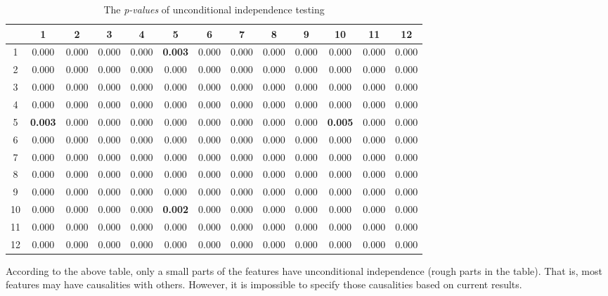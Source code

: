 \documentclass[12pt,a4paper]{article}
\theoremstyle{definition}
\begin{document}
\begin{table}[H]
	\renewcommand\arraystretch{1.35}
	\caption{The \textit{p-values} of unconditional independence testing}
	\label{tab:uncon-in}
	\centering
	
	\begin{tabular}{c|c|c|c|c|c|c|c|c|c|c|c|c}
		\centering
		\diagbox{id}{$p$}{id} & 1 & 2 & 3 & 4 & 5 & 6 & 7 & 8 & 9 & 10 & 11 & 12 \\
		\hline
		1 & 0.000 & 0.000 & 0.000 & 0.000 & \textbf{0.003} & 0.000 & 0.000 & 0.000 & 0.000 & 0.000 & 0.000 & 0.000 \\
		\hline
		2 & 0.000 & 0.000 & 0.000 & 0.000 & 0.000 & 0.000 & 0.000 & 0.000 & 0.000 & 0.000 & 0.000 & 0.000 \\
		\hline
		3 & 0.000 & 0.000 & 0.000 & 0.000 & 0.000 & 0.000 & 0.000 & 0.000 & 0.000 & 0.000 & 0.000 & 0.000 \\
		\hline
		4 & 0.000 & 0.000 & 0.000 & 0.000 & 0.000 & 0.000 & 0.000 & 0.000 & 0.000 & 0.000 & 0.000 & 0.000 \\
		\hline
		5 & \textbf{0.003} & 0.000 & 0.000 & 0.000 & 0.000 & 0.000 & 0.000 & 0.000 & 0.000 & \textbf{0.005} & 0.000 & 0.000 \\
		\hline
		6 & 0.000 & 0.000 & 0.000 & 0.000 & 0.000 & 0.000 & 0.000 & 0.000 & 0.000 & 0.000 & 0.000 & 0.000 \\
		\hline
		7 & 0.000 & 0.000 & 0.000 & 0.000 & 0.000 & 0.000 & 0.000 & 0.000 & 0.000 & 0.000 & 0.000 & 0.000 \\
		\hline
		8 & 0.000 & 0.000 & 0.000 & 0.000 & 0.000 & 0.000 & 0.000 & 0.000 & 0.000 & 0.000 & 0.000 & 0.000 \\
		\hline
		9 & 0.000 & 0.000 & 0.000 & 0.000 & 0.000 & 0.000 & 0.000 & 0.000 & 0.000 & 0.000 & 0.000 & 0.000 \\
		\hline
		10 & 0.000 & 0.000 & 0.000 & 0.000 & \textbf{0.002} & 0.000 & 0.000 & 0.000 & 0.000 & 0.000 & 0.000 & 0.000 \\
		\hline
		11 & 0.000 & 0.000 & 0.000 & 0.000 & 0.000 & 0.000 & 0.000 & 0.000 & 0.000 & 0.000 & 0.000 & 0.000 \\
		\hline
		12 & 0.000 & 0.000 & 0.000 & 0.000 & 0.000 & 0.000 & 0.000 & 0.000 & 0.000 & 0.000 & 0.000 & 0.000 \\
	\end{tabular}
\end{table}

According to the above table, only a small parts of the features have unconditional independence (rough parts in the table). That is, most features may have causalities with others. However, it is impossible to specify those causalities based on current results.
\end{document}
